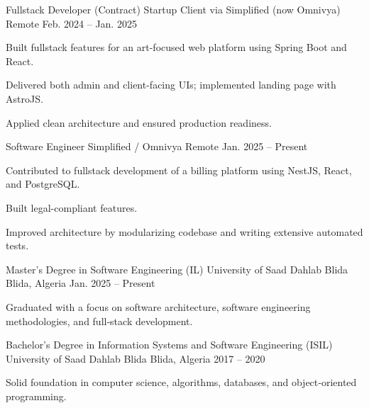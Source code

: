 \documentclass[11pt, a4paper]{awesome-cv}
\begin{document}
\begin{cventries}

  \cventry
    {Fullstack Developer (Contract)}
    {Startup Client via Simplified (now Omnivya)}
    {Remote}
    {Feb. 2024 -- Jan. 2025}
    {
      \begin{cvitems}
        \item {Built fullstack features for an art-focused web platform using Spring Boot and React.}
        \item {Delivered both admin and client-facing UIs; implemented landing page with AstroJS.}
        \item {Applied clean architecture and ensured production readiness.}
      \end{cvitems}
    }

  \vspace{1.2em}

  \cventry
    {Software Engineer}
    {Simplified / Omnivya}
    {Remote}
    {Jan. 2025 -- Present}
    {
      \begin{cvitems}
        \item {Contributed to fullstack development of a billing platform using NestJS, React, and PostgreSQL.}
        \item {Built legal-compliant features.}
        \item {Improved architecture by modularizing codebase and writing extensive automated tests.}
      \end{cvitems}
    }

\end{cventries}

\begin{cventries}

  \cventry
    {Master’s Degree in Software Engineering (IL)}
    {University of Saad Dahlab Blida}
    {Blida, Algeria}
    {Jan. 2025 -- Present}
    {
      \begin{cvitems}
        \item {Graduated with a focus on software architecture, software engineering methodologies, and full‑stack development.}
      \end{cvitems}
    }

  \cventry
    {Bachelor’s Degree in Information Systems and Software Engineering (ISIL)}
    {University of Saad Dahlab Blida}
    {Blida, Algeria}
    {2017 -- 2020}
    {
      \begin{cvitems}
        \item {Solid foundation in computer science, algorithms, databases, and object‑oriented programming.}
      \end{cvitems}
    }

\end{cventries}
\end{document}
